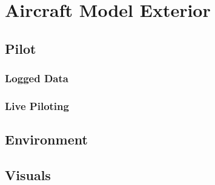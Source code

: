 \newpage
\section{Aircraft Model Exterior}

\subsection{Pilot}
\subsubsection{Logged Data}
\subsubsection{Live Piloting}

\subsection{Environment}
\subsection{Visuals}


%
